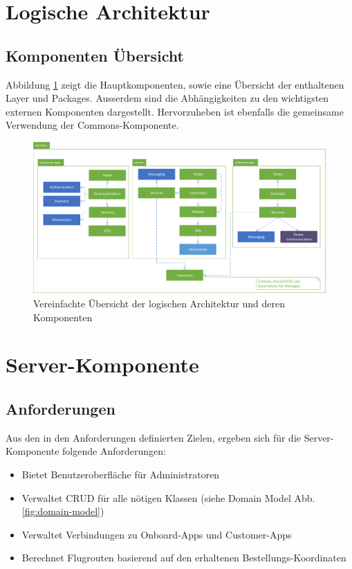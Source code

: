 \section{Logische Architektur}

\subsection{Komponenten Übersicht}

Abbildung \ref{fig:logical-architecture-overview} zeigt die Hauptkomponenten, sowie eine Übersicht der enthaltenen Layer und Packages. Ausserdem sind die Abhängigkeiten zu den wichtigsten externen Komponenten dargestellt. Hervorzuheben ist ebenfalls die gemeinsame Verwendung der Commons-Komponente. 

\begin{figure}[H]
	\includegraphics[width=1.0\textwidth]{images/logical-architecture-overview.pdf}
	\caption{Vereinfachte Übersicht der logischen Architektur und deren Komponenten }
	\label{fig:logical-architecture-overview}
\end{figure}

\section{Server-Komponente}

\subsection{Anforderungen}
Aus den in den Anforderungen definierten Zielen, ergeben sich für die Server-Komponente folgende Anforderungen:

\begin{itemize}
	\item Bietet Benutzeroberfläche für Administratoren
	\item Verwaltet \Gls{CRUD} für alle nötigen Klassen (siehe Domain Model Abb. \ref{fig:domain-model})
	\item Verwaltet Verbindungen zu Onboard-Apps und Customer-Apps
	\item Berechnet Flugrouten basierend auf den erhaltenen Bestellungs-Koordinaten
\end{itemize}

